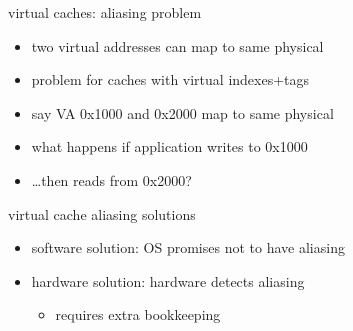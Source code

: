 \usetikzlibrary{arrows.meta,matrix,positioning}

\begin{frame}{virtual caches: aliasing problem}
    \begin{itemize}
        \item two virtual addresses can map to same physical
        \item problem for caches with virtual indexes+tags
        \vspace{.5cm}
        \item say VA 0x1000 and 0x2000 map to same physical
        \item what happens if application writes to 0x1000
        \item \ldots then reads from 0x2000?
    \end{itemize}
\end{frame}

\begin{frame}{virtual cache aliasing solutions}
    \begin{itemize}
    \item software solution: OS promises not to have aliasing
    \item hardware solution: hardware detects aliasing
        \begin{itemize}
        \item requires extra bookkeeping
        \end{itemize}
    \end{itemize}
\end{frame}

